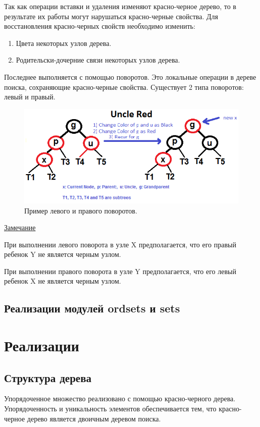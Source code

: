 		Так как операции вставки и удаления изменяют красно-черное дерево,
		то в результате их работы могут нарушаться красно-черные свойства. 
		Для восстановления красно-черных свойств необходимо изменить:
		\begin{enumerate}
			\item Цвета некоторых узлов дерева.
			\item Родительски-дочерние связи некоторых узлов дерева.
		\end{enumerate}
		
		Последнее выполняется с помощью поворотов. Это локальные операции в
		дереве поиска, сохраняющие красно-черные свойства.
		Существует 2 типа поворотов: левый и правый.
		
		\begin{figure}[H]
			\centering
			\includegraphics[width=\textwidth]{img/tan-aus.png}
			\caption{\label{fig:tan-aus}Пример левого и правого поворотов.}
		\end{figure}

		\underline{Замечание}

		При выполнении левого поворота в узле X предполагается, что
		его правый ребенок Y не является черным узлом.
	
		При выполнении правого поворота в узле Y предполагается, что
		его левый ребенок X не является черным узлом.


	\subsection{Реализации модулей ordsets и sets}
		




\section{Реализации}
	\subsection{Структура дерева}
		Упорядоченное множество реализовано с помощью красно-черного дерева. 
		Упорядоченность и уникальность элементов обеспечивается тем, 
		что красно-черное дерево является двоичным деревом поиска.

